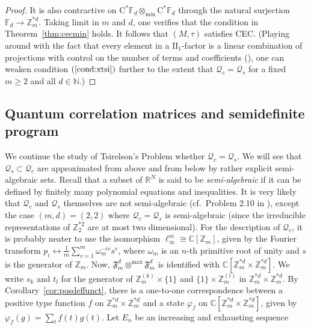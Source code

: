 \documentclass[12pt]{amsart}
\theoremstyle{definition}
\begin{document}
\begin{proof}
It is also contractive on $\mathrm{C}^*{{\mathbb F}}_d \otimes_{\min} \mathrm{C}^*{{\mathbb F}}_d$ through
the natural surjection ${{\mathbb F}}_d\to{{\mathbb Z}}_m^{*d}$.
Taking limit in $m$ and $d$, one verifies that
the condition in Theorem~\ref{thm:cecmin} holds.
It follows that $(M,\tau)$ satisfies CEC.
(Playing around with the fact that every element in a $\mathrm{II}_1$-factor is
a linear combination of projections with control on the number of terms and coefficients
(\cite{fh}), one can weaken condition $(\ref{cond:xtsi})$ further to the extent
that ${{\mathcal Q}}_c={{\mathcal Q}}_s$ for a fixed $m\geq2$ and all $d\in{{\mathbb N}}$.)
\end{proof}
\subsection{Quantum correlation matrices and semidefinite program}
We continue the study of Tsirelson's Problem whether ${{\mathcal Q}}_c={{\mathcal Q}}_s$.
We will see that ${{\mathcal Q}}_s\subset{{\mathcal Q}}_c$ are approximated from above and from
below by rather explicit semi-algebraic sets. Recall that a subset of ${{\mathbb R}}^N$
is said to be \emph{semi-algebraic} if it can be defined by finitely many
polynomial equations and inequalities.
It is very likely that ${{\mathcal Q}}_c$ and ${{\mathcal Q}}_s$ themselves are not semi-algebraic
(cf.\ Problem 2.10 in \cite{tsirelson}),
except the case $(m,d)=(2,2)$ where ${{\mathcal Q}}_c={{\mathcal Q}}_s$ is semi-algebraic (since
the irreducible representations of ${{\mathbb Z}}_2^{*2}$ are at most two dimensional).
For the description of ${{\mathcal Q}}_c$, it is probably neater to use the isomorphism
$\ell_\infty^m\cong{{\mathbb C}}[{{\mathbb Z}}_m]$, given by the Fourier transform
$p_i\leftrightarrow \frac{1}{m}\sum_{v=1}^m\omega_m^{-iv}s^v$, where
$\omega_m$ is an $n$-th primitive root of unity and $s$ is the generator of ${{\mathbb Z}}_m$.
Now, ${{\mathfrak F}_m^d}\otimes^{\max}{{\mathfrak F}_m^d}$ is identified with ${{\mathbb C}}[{{\mathbb Z}}_m^{*d}\times{{\mathbb Z}}_m^{*d}]$.
We write $s_k$ and $t_l$ for the generator of ${{\mathbb Z}}_m^{(k)}\times\{1\}$ and $\{1\}\times{{\mathbb Z}}_m^{(l)}$
in ${{\mathbb Z}}_m^{*d}\times{{\mathbb Z}}_m^{*d}$.
By Corollary~\ref{cor:posdeffunct}, there is a one-to-one correspondence between
a positive type function $f$ on ${{\mathbb Z}}_m^{*d}\times{{\mathbb Z}}_m^{*d}$ and
a state ${\varphi}_f$ on ${{\mathbb C}}[{{\mathbb Z}}_m^{*d}\times{{\mathbb Z}}_m^{*d}]$, given by
${\varphi}_f(g)=\sum_t f(t)g(t)$.
Let $E_n$ be an increasing and exhausting sequence
\end{document}
